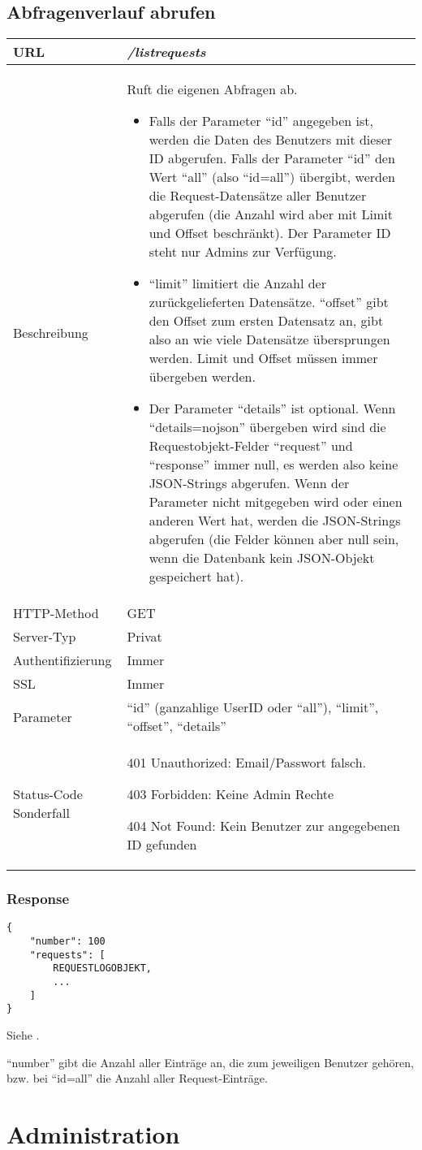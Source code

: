 \documentclass[ngerman,titlepage,parskip=true]{scrartcl}
\newcommand{\requestURL}[1]{\textit{#1}}
\newcommand{\request}[9]
{\subsection{#1}
\begin{tabular}{|p{0.2\textwidth}|p{0.7\textwidth}|}
\hline
  URL & \requestURL{#2}\\\hline
    Beschreibung & #3\\\hline
  HTTP-Method & #4\\\hline
  Server-Typ & #5\\\hline
  Authentifizierung & #6\\\hline
  SSL & #7\\\hline
  Parameter & #8\\\hline
  Status-Code Sonderfall & #9\\\hline
 \end{tabular}\vspace*{1em}}
{}%
{}%
{}%
{}%
{}%
{}%
{}%
{}%
\begin{document}
\request{Abfragenverlauf abrufen}%
{/listrequests}%
{Ruft die eigenen Abfragen ab. 
	\begin{itemize}
		\item Falls der Parameter ``id'' angegeben ist, werden die Daten des Benutzers mit dieser ID abgerufen. Falls der Parameter ``id'' den Wert ``all'' (also \mbox{``id=all''}) übergibt, werden die Request-Datensätze aller Benutzer abgerufen (die Anzahl wird aber mit Limit und Offset beschränkt). Der Parameter ID steht nur Admins zur Verfügung. 
		\item \mbox{``limit''} limitiert die Anzahl der zurückgelieferten Datensätze. \mbox{``offset''} gibt den Offset zum ersten Datensatz an, gibt also an wie viele Datensätze übersprungen werden. Limit und Offset müssen immer übergeben werden. 
		\item Der Parameter ``details'' ist optional. Wenn \mbox{``details=nojson''} übergeben wird sind die Requestobjekt-Felder \mbox{``request''} und \mbox{``response''} immer null, es werden also keine JSON-Strings abgerufen. Wenn der Parameter nicht mitgegeben wird oder einen anderen Wert hat, werden die JSON-Strings abgerufen (die Felder können aber null sein, wenn die Datenbank kein JSON-Objekt gespeichert hat).
\end{itemize}
}%
{GET}%
{Privat}%
{Immer}%
{Immer}%
{``id'' (ganzahlige UserID oder ``all''), ``limit'', ``offset'', ``details''}%
{401 Unauthorized: Email/Passwort falsch.\par
 403 Forbidden: Keine Admin Rechte\par
404 Not Found: Kein Benutzer zur angegebenen ID gefunden}%


	
\subsubsection{Response}		
		\begin{lstlisting}
{
	"number": 100
	"requests": [
		REQUESTLOGOBJEKT,
		...
	]
}
		\end{lstlisting}
		
Siehe .

		``number'' gibt die Anzahl aller Einträge an, die zum jeweiligen Benutzer gehören, bzw. bei \mbox{``id=all''} die Anzahl aller Request-Einträge.
		
	

\section{Administration}
\end{document}
